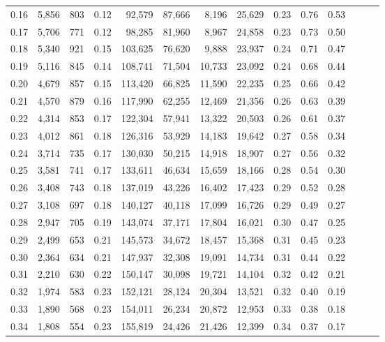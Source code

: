 \begin{tabular}{rrrrrrrrrrrrrr}
0.16 &  5,856 &  803 &  0.12 &   92,579 &   87,666 &   8,196 &  25,629 &  0.23 &  0.76 &      0.53 \\
0.17 &  5,706 &  771 &  0.12 &   98,285 &   81,960 &   8,967 &  24,858 &  0.23 &  0.73 &      0.50 \\
0.18 &  5,340 &  921 &  0.15 &  103,625 &   76,620 &   9,888 &  23,937 &  0.24 &  0.71 &      0.47 \\
0.19 &  5,116 &  845 &  0.14 &  108,741 &   71,504 &  10,733 &  23,092 &  0.24 &  0.68 &      0.44 \\
0.20 &  4,679 &  857 &  0.15 &  113,420 &   66,825 &  11,590 &  22,235 &  0.25 &  0.66 &      0.42 \\
0.21 &  4,570 &  879 &  0.16 &  117,990 &   62,255 &  12,469 &  21,356 &  0.26 &  0.63 &      0.39 \\
0.22 &  4,314 &  853 &  0.17 &  122,304 &   57,941 &  13,322 &  20,503 &  0.26 &  0.61 &      0.37 \\
0.23 &  4,012 &  861 &  0.18 &  126,316 &   53,929 &  14,183 &  19,642 &  0.27 &  0.58 &      0.34 \\
0.24 &  3,714 &  735 &  0.17 &  130,030 &   50,215 &  14,918 &  18,907 &  0.27 &  0.56 &      0.32 \\
0.25 &  3,581 &  741 &  0.17 &  133,611 &   46,634 &  15,659 &  18,166 &  0.28 &  0.54 &      0.30 \\
0.26 &  3,408 &  743 &  0.18 &  137,019 &   43,226 &  16,402 &  17,423 &  0.29 &  0.52 &      0.28 \\
0.27 &  3,108 &  697 &  0.18 &  140,127 &   40,118 &  17,099 &  16,726 &  0.29 &  0.49 &      0.27 \\
0.28 &  2,947 &  705 &  0.19 &  143,074 &   37,171 &  17,804 &  16,021 &  0.30 &  0.47 &      0.25 \\
0.29 &  2,499 &  653 &  0.21 &  145,573 &   34,672 &  18,457 &  15,368 &  0.31 &  0.45 &      0.23 \\
0.30 &  2,364 &  634 &  0.21 &  147,937 &   32,308 &  19,091 &  14,734 &  0.31 &  0.44 &      0.22 \\
0.31 &  2,210 &  630 &  0.22 &  150,147 &   30,098 &  19,721 &  14,104 &  0.32 &  0.42 &      0.21 \\
0.32 &  1,974 &  583 &  0.23 &  152,121 &   28,124 &  20,304 &  13,521 &  0.32 &  0.40 &      0.19 \\
0.33 &  1,890 &  568 &  0.23 &  154,011 &   26,234 &  20,872 &  12,953 &  0.33 &  0.38 &      0.18 \\
0.34 &  1,808 &  554 &  0.23 &  155,819 &   24,426 &  21,426 &  12,399 &  0.34 &  0.37 &      0.17 \\

\end{tabular}
